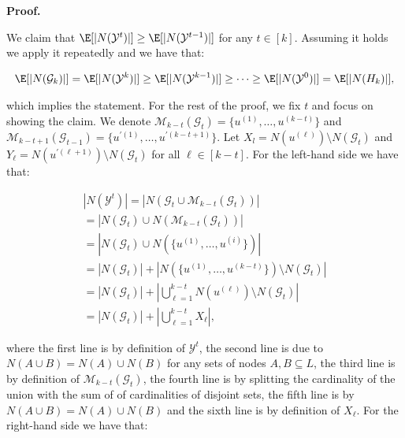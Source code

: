 


\par\medskip\noindent\textbf{Proof.}\par



We claim that $\E[|N(\mathcal{Y}^{t})|]\geq\E[|N(\mathcal{Y}^{t-1})|]$ for any $t\in[k]$.
Assuming it holds we apply it repeatedly and we have that:\par


\[\begin{gathered}
\displaystyle\E[|N(\mathcal{G}_{k})|]=\E[|N(\mathcal{Y}^{k})|]\geq\E[|N(\mathcal{Y}^{k-1})|]\geq\dots\geq\E[|N(\mathcal{Y}^{0})|]=\E[|N(H_{k})|],
\end{gathered}\]


which implies the statement.
For the rest of the proof, we fix $t$ and focus on showing the claim.
We denote $\mathcal{M}_{k-t}(\mathcal{G}_{t})=\{u^{(1)},\dots,u^{(k-t)}\}$ and $\mathcal{M}_{k-t+1}(\mathcal{G}_{t-1})=\{u^{\prime(1)},\dots,u^{\prime(k-t+1)}\}$.
Let $X_{l}=N(u^{(\ell)})\setminus N(\mathcal{G}_{t})$ and $Y_{\ell}=N(u^{\prime(\ell+1)})\setminus N(\mathcal{G}_{t})$ for all $\ell\in[k-t]$.
For the left-hand side we have that:\par


\[\begin{gathered}
\displaystyle|N(\mathcal{Y}^{t})| \displaystyle=|N(\mathcal{G}_{t}\cup\mathcal{M}_{k-t}(\mathcal{G}_{t}))| \\
\displaystyle=|N(\mathcal{G}_{t})\cup N(\mathcal{M}_{k-t}(\mathcal{G}_{t}))| \\
\displaystyle=|N(\mathcal{G}_{t})\cup N(\{u^{(1)},\dots,u^{(i)}\})| \\
\displaystyle=|N(\mathcal{G}_{t})|+|N(\{u^{(1)},\dots,u^{(k-t)}\})\setminus N(\mathcal{G}_{t})| \\
\displaystyle=|N(\mathcal{G}_{t})|+|\bigcup_{\ell=1}^{k-t}{N(u^{(\ell)})\setminus N(\mathcal{G}_{t})}| \\
\displaystyle=|N(\mathcal{G}_{t})|+|\bigcup_{\ell=1}^{k-t}{X_{\ell}}|,
\end{gathered}\]


where the first line is by definition of $\mathcal{Y}^{t}$, the second line is due to $N(A\cup B)=N(A)\cup N(B)$ for any sets of nodes $A,B\subseteq L$, the third line is by definition of $\mathcal{M}_{k-t}(\mathcal{G}_{t})$, the fourth line is by splitting the cardinality of the union with the sum of of cardinalities of disjoint sets, the fifth line is by $N(A\cup B)=N(A)\cup N(B)$ and the sixth line is by definition of $X_{\ell}$.
For the right-hand side we have that:\par


